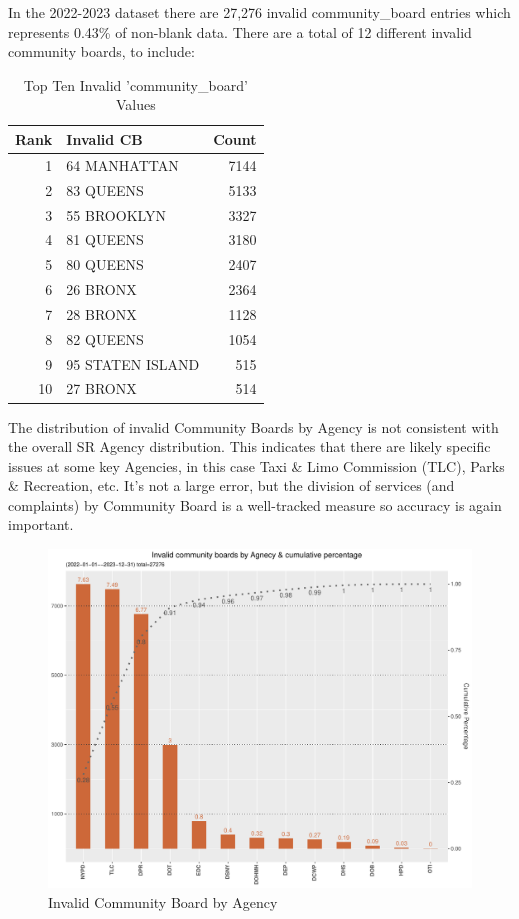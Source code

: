 \documentclass[12pt, titlepage]{article}
\begin{document}
{	In the 2022-2023 dataset there are 27,276 invalid community\_board entries which represents 0.43\% of non-blank data. 
	There are a total of 12 different invalid community boards, to include: 
	
		\begin{table}[tbp]
		\centering
		\caption{Top Ten Invalid 'community\_board' Values}
		\footnotesize
		\begin{tabular}{rlr}
		\toprule
		\textbf{Rank} & \textbf{Invalid CB} & \textbf{Count} \\
			\midrule
				1 & 64 MANHATTAN & 7144 \\
				2 & 83 QUEENS & 5133 \\
				3 & 55 BROOKLYN & 3327 \\
				4 & 81 QUEENS & 3180 \\
				5 & 80 QUEENS & 2407 \\
				6 & 26 BRONX & 2364 \\
				7 & 28 BRONX & 1128 \\
				8 & 82 QUEENS & 1054 \\
				9 & 95 STATEN ISLAND & 515 \\
				10 & 27 BRONX & 514 \\
			\bottomrule
		\end{tabular}
		\end{table}
		
		The distribution of invalid Community Boards by Agency is not consistent with the overall SR Agency distribution. This indicates that there are likely
		specific issues at some key Agencies, in this case Taxi \& Limo Commission (TLC), Parks \& Recreation, etc. It's not a large error, but the division of services
		(and complaints) by Community Board is a well-tracked measure so accuracy is again important.

		\begin{figure}[tbp]
	 	 \centering
		  \includegraphics[width = \textwidth]{invalid_community_boards.pdf}
		  \caption{Invalid Community Board by Agency}
		  \label{fig:invalid_community_boards}
		\end{figure}


}
\end{document}
